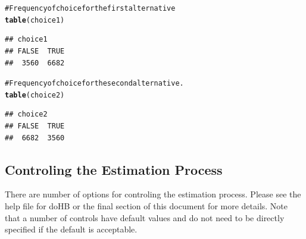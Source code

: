 \documentclass{article}\usepackage{graphicx, color}
\makeatletter
\newcommand{\hlfunctioncall}[1]{\textcolor[rgb]{0.501960784313725,0,0.329411764705882}{\textbf{#1}}}%
\newcommand{\hlcomment}[1]{\textcolor[rgb]{0.180392156862745,0.6,0.341176470588235}{#1}}%
\newenvironment{kframe}{%
 \def\at@end@of@kframe{}%
 \ifinner\ifhmode%
  \def\at@end@of@kframe{\end{minipage}}%
  \begin{minipage}{\columnwidth}%
 \fi\fi%
 \def\FrameCommand##1{\hskip\@totalleftmargin \hskip-\fboxsep
 \colorbox{shadecolor}{##1}\hskip-\fboxsep
     \hskip-\linewidth \hskip-\@totalleftmargin \hskip\columnwidth}%
 \MakeFramed {\advance\hsize-\width
   \@totalleftmargin\z@ \linewidth\hsize
   \@setminipage}}%
 {\par\unskip\endMakeFramed%
 \at@end@of@kframe}
\newenvironment{knitrout}{}{} %
\makeatother
\begin{document}
\begin{knitrout}
\begin{kframe}
\begin{alltt}
\hlcomment{# Frequency of choice for the first alternative}
\hlfunctioncall{table}(choice1)
\end{alltt}
\begin{verbatim}
## choice1
## FALSE  TRUE 
##  3560  6682
\end{verbatim}
\begin{alltt}

\hlcomment{# Frequency of choice for the second alternative.}
\hlfunctioncall{table}(choice2)
\end{alltt}
\begin{verbatim}
## choice2
## FALSE  TRUE 
##  6682  3560
\end{verbatim}
\end{kframe}
\end{knitrout}


\subsection*{Controling the Estimation Process}

There are number of options for controling the estimation process. Please see the help file for doHB or the final section of this document for more details. Note that a number of controls have default values and do not need to be directly specified if the default is acceptable.
\end{document}
